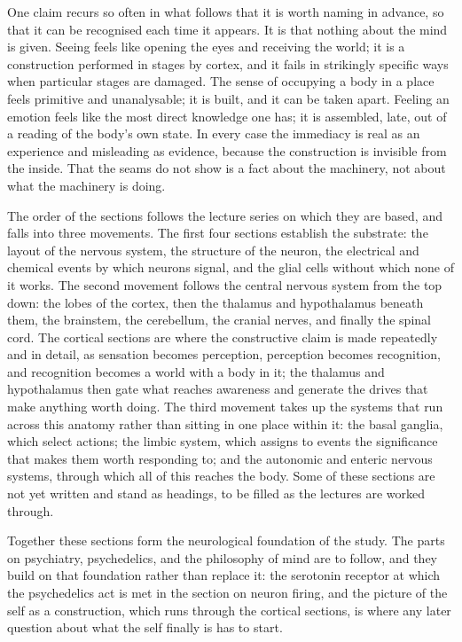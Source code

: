 \documentclass[11pt]{article}
\begin{document}
One claim recurs so often in what follows that it is worth naming in advance, so that it can be recognised each time it appears. It is that nothing about the mind is given. Seeing feels like opening the eyes and receiving the world; it is a construction performed in stages by cortex, and it fails in strikingly specific ways when particular stages are damaged. The sense of occupying a body in a place feels primitive and unanalysable; it is built, and it can be taken apart. Feeling an emotion feels like the most direct knowledge one has; it is assembled, late, out of a reading of the body's own state. In every case the immediacy is real as an experience and misleading as evidence, because the construction is invisible from the inside. That the seams do not show is a fact about the machinery, not about what the machinery is doing.

The order of the sections follows the lecture series on which they are based, and falls into three movements. The first four sections establish the substrate: the layout of the nervous system, the structure of the neuron, the electrical and chemical events by which neurons signal, and the glial cells without which none of it works. The second movement follows the central nervous system from the top down: the lobes of the cortex, then the thalamus and hypothalamus beneath them, the brainstem, the cerebellum, the cranial nerves, and finally the spinal cord. The cortical sections are where the constructive claim is made repeatedly and in detail, as sensation becomes perception, perception becomes recognition, and recognition becomes a world with a body in it; the thalamus and hypothalamus then gate what reaches awareness and generate the drives that make anything worth doing. The third movement takes up the systems that run across this anatomy rather than sitting in one place within it: the basal ganglia, which select actions; the limbic system, which assigns to events the significance that makes them worth responding to; and the autonomic and enteric nervous systems, through which all of this reaches the body. Some of these sections are not yet written and stand as headings, to be filled as the lectures are worked through.

Together these sections form the neurological foundation of the study. The parts on psychiatry, psychedelics, and the philosophy of mind are to follow, and they build on that foundation rather than replace it: the serotonin receptor at which the psychedelics act is met in the section on neuron firing, and the picture of the self as a construction, which runs through the cortical sections, is where any later question about what the self finally is has to start.
\end{document}
